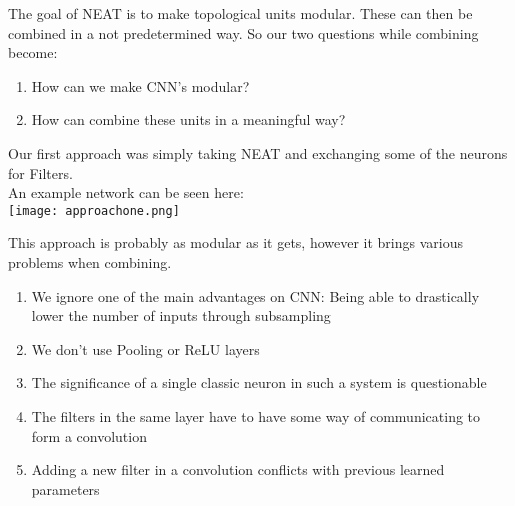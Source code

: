 The goal of NEAT is to make topological units modular.  
These can then be combined in a not predetermined way.  
So our two questions while combining become:  
\begin{enumerate}
	\item{How can we make CNN's modular?}  
	\item{How can combine these units in a meaningful way?}  
\end{enumerate}

Our first approach was simply taking NEAT and exchanging some of the neurons for Filters.\\
An example network can be seen here:\\

\texttt{[image: approachone.png]}  

This approach is probably as modular as it gets, however it brings various problems when combining.  
\begin{enumerate}
	\item{We ignore one of the main advantages on CNN: Being able to drastically lower the number of inputs through subsampling}
	\item{We don't use Pooling or ReLU layers}
	\item{The significance of a single classic neuron in such a system is questionable}
	\item{The filters in the same layer have to have some way of communicating to form a convolution}
	\item{Adding a new filter in a convolution conflicts with previous learned parameters}
\end{enumerate}

